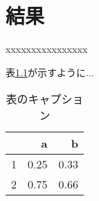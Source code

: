 \chapter{結果}
xxxxxxxxxxxxxxxx

表\ref{table1}が示すように...\\

\begin{table}[h]
    \centering
    \begin{tabular}{r|rr}
    & a & b\\ \hline
    1& 0.25 & 0.33\\
    2& 0.75 & 0.66\\
    \end{tabular}
    \caption{表のキャプション}
    \label{table1}
\end{table}
